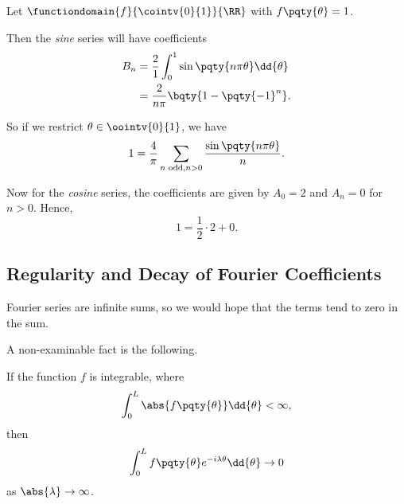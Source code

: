 \begin{example}
    Let \(\functiondomain{f}{\cointv{0}{1}}{\RR}\) with \(f\pqty{\theta} = 1\).

    Then the \emph{sine} series will have coefficients
    \begin{subequations}
        \begin{align}
            B_n &= \frac{2}{1} \int_{0}^{1} \sin\pqty{n \pi \theta} \dd{\theta} \\
            &= \frac{2}{n \pi} \bqty{1 - \pqty{-1}^{n}}.
        \end{align}
    \end{subequations}

    So if we restrict \(\theta \in \oointv{0}{1}\), we have
    \begin{equation}
        1 = \frac{4}{\pi} \sum_{n \text{ odd}, n > 0} \frac{\sin\pqty{n \pi \theta}}{n}.
    \end{equation}

    Now for the \emph{cosine} series, the coefficients are given by \(A_0 = 2\) and \(A_n = 0\) for \(n > 0\). Hence,
    \begin{equation}
        1 = \frac{1}{2} \cdot 2 + 0.
    \end{equation}
\end{example}

\subsection{Regularity and Decay of Fourier Coefficients}

Fourier series are infinite sums, so we would hope that the terms tend to zero in the sum.

A non-examinable fact is the following.

\small

\begin{theorem}
    \label{thm:riemann-lebesgue-lemma}%
    If the function \(f\) is integrable, where
    \begin{equation}
        \int_{0}^{L} \abs{f\pqty{\theta}} \dd{\theta} < \infty,
    \end{equation}
    then
    \begin{equation}
        \int_{0}^{L} f\pqty{\theta} e^{- i \lambda \theta} \dd{\theta} \to 0
    \end{equation}
    as \(\abs{\lambda} \to \infty\).
\end{theorem}


